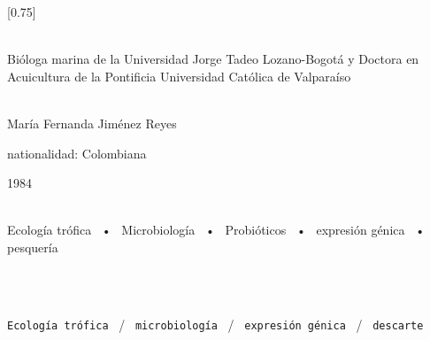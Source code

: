 \documentclass[lighthipster]{simplehipstercv}
\begin{document}
\setlength{\columnsep}{1.5cm}
[0.75]
\begin{paracol}{2}

\paracolbackgroundoptions



\footnotesize
{\setasidefontcolour
\flushright
\begin{center}
\end{center}

\\[0.5em]

{Bióloga marina de la Universidad Jorge Tadeo Lozano-Bogotá y Doctora en Acuicultura de la Pontificia Universidad Católica de Valparaíso}
\bigskip

 \\[0.5em]
María Fernanda Jiménez Reyes

nationalidad: Colombiana 

1984

\bigskip

 \\[0.5em]

Ecología trófica ~•~ Microbiología ~•~ Probióticos ~•~ expresión génica ~•~ pesquería

\bigskip



\bigskip

\\[0.5em]

\lorem
\bigskip

\\[0.5em]

\texttt{Ecología trófica} ~/~ \texttt{microbiología} ~/~ \texttt{expresión génica} ~/~ \texttt{descarte}



\vspace{4em}


\phantom{turn the page}

\phantom{turn the page}
}
\switchcolumn


\end{paracol}
\end{document}
